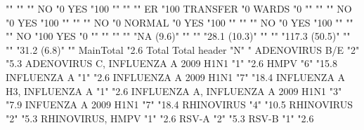 \documentclass{article}\usepackage[]{graphicx}\usepackage[]{color}
\begin{document}
                                    ""     ""             ""     
NO                                  "0%
YES                                 "100%
                                    ""     ""             ""     
ER                                  "100%
TRANSFER                            "0%
WARDS                               "0%
                                    ""     ""             ""     
NO                                  "0%
YES                                 "100%
                                    ""     ""             ""     
NO                                  "0%
NORMAL                              "0%
YES                                 "100%
                                    ""     ""             ""     
NO                                  "0%
YES                                 "100%
                                    ""     ""             ""     
NO                                  "100%
YES                                 "0%
                                    ""     ""             ""     
                                    ""     "NA (9.6)"     ""     
                                    ""     "28.1 (10.3)"  ""     
                                    ""     "117.3 (50.5)" ""     
                                    ""     "31.2 (6.8)"   ""     
MainTotal                           "2.6%
                                    Total          Total %
header                              "N"            "%
ADENOVIRUS B/E                      "2"            "5.3%
ADENOVIRUS C, INFLUENZA A 2009 H1N1 "1"            "2.6%
HMPV                                "6"            "15.8%
INFLUENZA A                         "1"            "2.6%
INFLUENZA A 2009 H1N1               "7"            "18.4%
INFLUENZA A H3, INFLUENZA A         "1"            "2.6%
INFLUENZA A, INFLUENZA A 2009 H1N1  "3"            "7.9%
INFUENZA A 2009 H1N1                "7"            "18.4%
RHINOVIRUS                          "4"            "10.5%
RHINOVIRUS                          "2"            "5.3%
RHINOVIRUS, HMPV                    "1"            "2.6%
RSV-A                               "2"            "5.3%
RSV-B                               "1"            "2.6%
\end{document}
